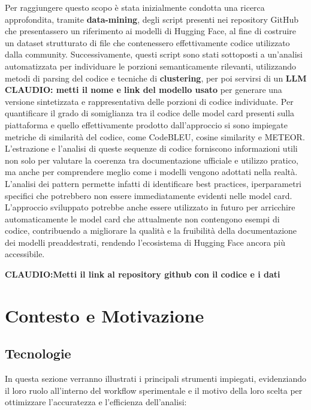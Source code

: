 \documentclass{article}
\begin{document}
Per raggiungere questo scopo è stata inizialmente condotta una ricerca approfondita, tramite \textbf{data-mining}, degli script presenti nei repository GitHub che presentassero un riferimento ai modelli di Hugging Face, al fine di costruire un dataset strutturato di file che contenessero effettivamente codice utilizzato dalla community. Successivamente, questi script sono stati sottoposti a un’analisi automatizzata per individuare le porzioni semanticamente rilevanti, utilizzando metodi di parsing del codice e tecniche di \textbf{clustering}, per poi servirsi di un \textbf{LLM} \textbf{CLAUDIO: metti il nome e link del modello usato} per generare una versione sintetizzata e rappresentativa delle porzioni di codice individuate. Per quantificare il grado di somiglianza tra il codice delle model card presenti sulla piattaforma e quello effettivamente prodotto dall'approccio si sono impiegate metriche di similarità del codice, come CodeBLEU, cosine similarity e METEOR.\\
L’estrazione e l’analisi di queste sequenze di codice forniscono informazioni utili non solo per valutare la coerenza tra documentazione ufficiale e utilizzo pratico, ma anche per comprendere meglio come i modelli vengono adottati nella realtà. L’analisi dei pattern permette infatti di identificare best practices, iperparametri specifici che potrebbero non essere immediatamente evidenti nelle model card.
L’approccio sviluppato potrebbe anche essere utilizzato in futuro per arricchire automaticamente le model card che attualmente non contengono esempi di codice, contribuendo a migliorare la qualità e la fruibilità della documentazione dei modelli preaddestrati, rendendo l’ecosistema di Hugging Face ancora più accessibile.

\textbf{CLAUDIO:Metti il link al repository github con il codice e i dati}

\section{Contesto e Motivazione}
\subsection{Tecnologie}
In questa sezione verranno illustrati i principali strumenti impiegati, evidenziando il loro ruolo all'interno del workflow sperimentale e il motivo della loro scelta per ottimizzare l'accuratezza e l'efficienza dell’analisi:
\end{document}
